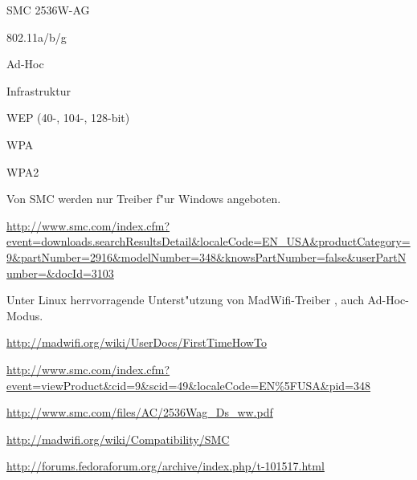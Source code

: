 %
%
\begin{wlandevice}{SMC 2536W-AG}



\begin{wlanieeestandard}
\item 802.11a/b/g
\end{wlanieeestandard}

\begin{wlanmode}
\item Ad-Hoc
\item Infrastruktur
\end{wlanmode}

\begin{wlansecurity}
\item WEP (40-, 104-, 128-bit)
\item WPA
\item WPA2
\end{wlansecurity}

\begin{wlandriver}
\item
Von SMC werden nur Treiber f"ur Windows angeboten.

\url{http://www.smc.com/index.cfm?event=downloads.searchResultsDetail&localeCode=EN_USA&productCategory=9&partNumber=2916&modelNumber=348&knowsPartNumber=false&userPartNumber=&docId=3103}

Unter Linux herrvorragende Unterst"utzung von MadWifi-Treiber  \cite{madwifi},
auch Ad-Hoc-Modus.
\end{wlandriver}


\begin{wlaninstall}
\item
\url{http://madwifi.org/wiki/UserDocs/FirstTimeHowTo}
\end{wlaninstall}

\begin{wlanlink}
\item \url{http://www.smc.com/index.cfm?event=viewProduct&cid=9&scid=49&localeCode=EN\%5FUSA&pid=348}
\item \url{http://www.smc.com/files/AC/2536Wag_Ds_ww.pdf}
\item \url{http://madwifi.org/wiki/Compatibility/SMC}
\item \url{http://forums.fedoraforum.org/archive/index.php/t-101517.html}
\end{wlanlink}

\end{wlandevice}

